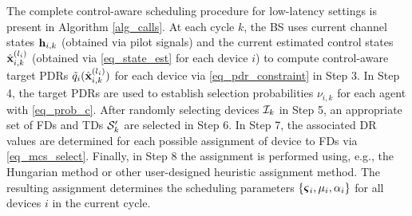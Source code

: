 The complete control-aware scheduling procedure for low-latency settings is present in Algorithm \ref{alg_calls}. At each cycle $k$, the BS uses current channel states ${\mathbf h}_{i,k}$ (obtained via pilot signals) and the current estimated control states ${\hat{\mathbf x} }^{(l_i)}_{i,k}$  (obtained via \eqref{eq_state_est} for each device $i$) to compute control-aware target PDRs  ${\tilde q}_i({\hat{\mathbf x} }^{(l_i)}_{i,k})$ for each device via \eqref{eq_pdr_constraint} in Step 3. In Step 4, the target PDRs are used to establish selection probabilities $\nu_{i,k}$ for each agent with \eqref{eq_prob_c}. After randomly selecting devices ${\mathcal I}_k$ in Step 5, an appropriate set of FDs and TDs ${\mathcal S}'_k$ are selected in Step 6. In Step 7, the associated DR values are determined for each possible assignment of device to FDs via \eqref{eq_mcs_select}. Finally, in Step 8 the assignment is performed using, e.g., the Hungarian method or other user-designed heuristic assignment method. The resulting assignment determines the scheduling parameters $\{\boldsymbol{\varsigma}_i, \mu_i, \alpha_i\}$ for all devices $i$ in the current cycle. 
 